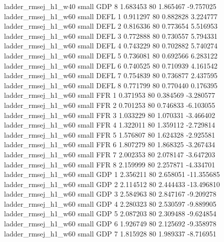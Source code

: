      ladder_rmsej_h1_w40      small      GDP                 8 1.683453 80       1.865467          -9.757025
     ladder_rmsej_h1_w60      small     DEFL                 1 0.911297 80       0.882828           3.224777
     ladder_rmsej_h1_w60      small     DEFL                 2 0.816336 80       0.773654           5.516953
     ladder_rmsej_h1_w60      small     DEFL                 3 0.772888 80       0.730557           5.794331
     ladder_rmsej_h1_w60      small     DEFL                 4 0.743229 80       0.702882           5.740274
     ladder_rmsej_h1_w60      small     DEFL                 5 0.736081 80       0.692566           6.283122
     ladder_rmsej_h1_w60      small     DEFL                 6 0.740525 80       0.710939           4.161542
     ladder_rmsej_h1_w60      small     DEFL                 7 0.754839 80       0.736877           2.437595
     ladder_rmsej_h1_w60      small     DEFL                 8 0.771799 80       0.770440           0.176395
     ladder_rmsej_h1_w60      small      FFR                 1 0.371953 80       0.384569          -3.280577
     ladder_rmsej_h1_w60      small      FFR                 2 0.701253 80       0.746833          -6.103055
     ladder_rmsej_h1_w60      small      FFR                 3 1.033229 80       1.070331          -3.466402
     ladder_rmsej_h1_w60      small      FFR                 4 1.322011 80       1.359112          -2.729814
     ladder_rmsej_h1_w60      small      FFR                 5 1.576807 80       1.624328          -2.925581
     ladder_rmsej_h1_w60      small      FFR                 6 1.807279 80       1.868325          -3.267434
     ladder_rmsej_h1_w60      small      FFR                 7 2.002353 80       2.078147          -3.647203
     ladder_rmsej_h1_w60      small      FFR                 8 2.159999 80       2.257871          -4.334701
     ladder_rmsej_h1_w60      small      GDP                 1 2.356211 80       2.658051         -11.355685
     ladder_rmsej_h1_w60      small      GDP                 2 2.114512 80       2.444433         -13.496810
     ladder_rmsej_h1_w60      small      GDP                 3 2.584963 80       2.847167          -9.209278
     ladder_rmsej_h1_w60      small      GDP                 4 2.280323 80       2.530597          -9.889905
     ladder_rmsej_h1_w60      small      GDP                 5 2.087203 80       2.309488          -9.624854
     ladder_rmsej_h1_w60      small      GDP                 6 1.926749 80       2.125692          -9.358978
     ladder_rmsej_h1_w60      small      GDP                 7 1.815928 80       1.989337          -8.716951
